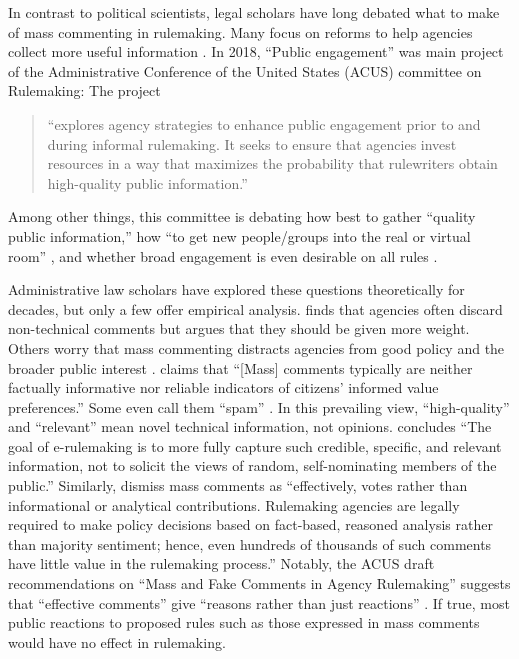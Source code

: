 In contrast to political scientists, legal scholars have long debated what to make of mass commenting in rulemaking. Many focus on reforms to help agencies collect more useful information \citep{Farina2011, Farina2014, Rauch2016}. In 2018, ``Public engagement'' was main project of the Administrative Conference of the United States (ACUS) committee on Rulemaking: %
{The project} 
\begin{quote}``explores agency strategies to enhance public engagement prior to and during informal rulemaking. It seeks to ensure that agencies invest resources in a way that maximizes the probability that rulewriters obtain high-quality public information.'' 
\end{quote} 
Among other things, this committee is debating how best to gather ``quality public information,'' how ``to get new people/groups into the real or virtual room'' \citep{Farina2018}, and whether broad engagement is even desirable on all rules \citep{White2018}. 

Administrative law scholars have explored these questions theoretically for decades, but only a few offer empirical analysis. \citet{Mendelson2011} finds that agencies often discard non-technical comments but argues that they should be given more weight. Others worry that mass commenting distracts agencies from good policy and the broader public interest \citep{Coglianese2006}. \citet[p. 112]{Farina2012} claims that ``[Mass] comments typically are neither factually informative nor reliable indicators of citizens’ informed value preferences.'' Some even call them ``spam'' \citep{Balla2018, Novek2004}. In this prevailing view, ``high-quality'' and ``relevant'' mean novel technical information, not opinions. \citet[p. 208]{Herz2016} concludes ``The goal of e-rulemaking is to more fully capture such credible, specific, and relevant information, not to solicit the views of random, self-nominating members of the public.'' Similarly,  \citet[p. 4]{Epstein2014} dismiss mass comments as ``effectively, votes rather than informational or analytical contributions. Rulemaking agencies are legally required to make policy decisions based on fact-based, reasoned analysis rather than majority sentiment; hence, even hundreds of thousands of such comments have little value in the rulemaking process.''  Notably, the ACUS draft recommendations on ``Mass and Fake Comments in Agency Rulemaking'' suggests that ``effective comments'' give ``reasons rather than just reactions'' \citep[p. 33]{ACUS2018}. If true, most public reactions to proposed rules such as those expressed in mass comments would have no effect in rulemaking. 

